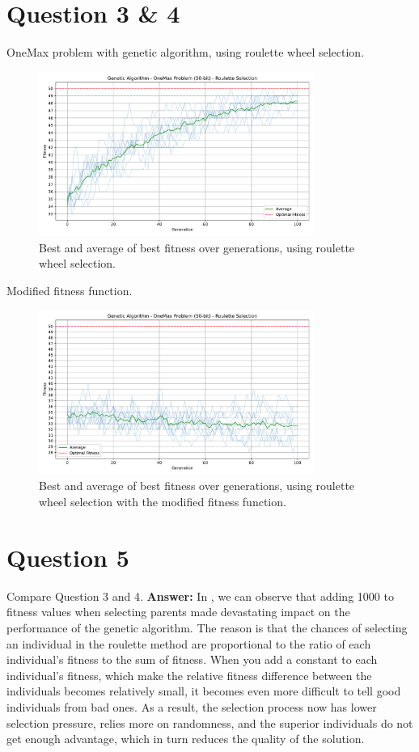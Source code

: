 \documentclass[12pt,letterpaper]{article}
\newcommand{\xAns}{\vskip 2mm\textbf{Answer:} }
\begin{document}
\section*{Question 3 \& 4}
OneMax problem with genetic algorithm, using roulette wheel selection.
\begin{figure}[H]
    \centering
    \includegraphics[width=0.8\textwidth]{images/oneMax_GA_roulette.pdf}
    \caption{Best and average of best fitness over generations, using roulette wheel selection.}
    \label{fig:3a}
\end{figure}
Modified fitness function.
\begin{figure}[H]
    \centering
    \includegraphics[width=0.8\textwidth]{images/oneMax_GA_roulette_mod.pdf}
    \caption{Best and average of best fitness over generations, using roulette wheel selection with the modified fitness function.}
    \label{fig:4a}
\end{figure}

\section*{Question 5}
Compare Question 3 and 4. \xAns In , we can observe that adding 1000 to fitness values when selecting parents made devastating impact on the performance of the genetic algorithm. The reason is that the chances of selecting an individual in the roulette method are proportional to the ratio of each individual's fitness to the sum of fitness. When you add a constant to each individual's fitness, which make the relative fitness difference between the individuals becomes relatively small, it becomes even more difficult to tell good individuals from bad ones. As a result, the selection process now has lower selection pressure, relies more on randomness, and the superior individuals do not get enough advantage, which in turn reduces the quality of the solution.
\end{document}

